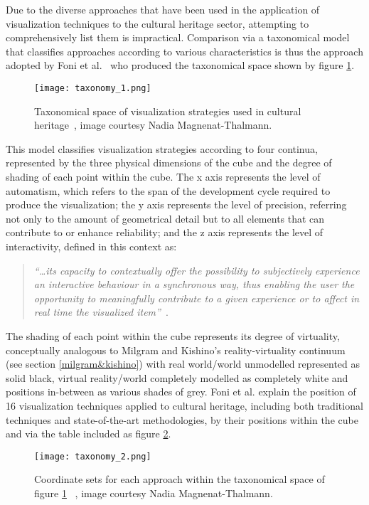 Due to the diverse approaches that have been used in the application of visualization techniques to the cultural heritage sector, attempting to comprehensively list them is impractical. Comparison via a taxonomical model that classifies approaches according to various characteristics is thus the approach adopted by Foni et al.~\cite{Foni2010} who produced the taxonomical space shown by figure \ref{taxonomy_1.png}.

\begin{figure}[h]
\centering
  \texttt{[image: taxonomy\_1.png]}
  \caption{Taxonomical space of visualization strategies used in cultural heritage~\cite{Foni2010}, image courtesy Nadia Magnenat-Thalmann.}
  \label{taxonomy_1.png}
\end{figure}

This model classifies visualization strategies according to four continua, represented by the three physical dimensions of the cube and the degree of shading of each point within the cube. The x axis represents the level of automatism, which refers to the span of the development cycle required to produce the visualization; the y axis represents the level of precision, referring not only to the amount of geometrical detail but to all elements that can contribute to or enhance reliability; and the z axis represents the level of interactivity, defined in this context as:

\begin{quote}
	\textit{``\ldots its capacity to contextually offer the possibility to subjectively experience an interactive behaviour in a synchronous way, thus enabling the user the opportunity to meaningfully contribute to a given experience or to affect in real time the visualized  item''}~\cite{Foni2010}.
\end{quote}

The shading of each point within the cube represents its degree of virtuality, conceptually analogous to Milgram and Kishino's reality-virtuality continuum (see section \ref{milgram&kishino}) with real world/world unmodelled represented as solid black, virtual reality/world completely modelled as completely white and positions in-between as various shades of grey. Foni et al. explain the position of 16 visualization techniques applied to cultural heritage, including both traditional techniques and state-of-the-art methodologies, by their positions within the cube and via the table included as figure \ref{taxonomy_2.png}.

\begin{figure}[h]
\centering
  \texttt{[image: taxonomy\_2.png]}
  \caption{Coordinate sets for each approach within the taxonomical space of figure \ref{taxonomy_1.png} ~\cite{Foni2010}, image courtesy Nadia Magnenat-Thalmann.}
  \label{taxonomy_2.png}
\end{figure}

